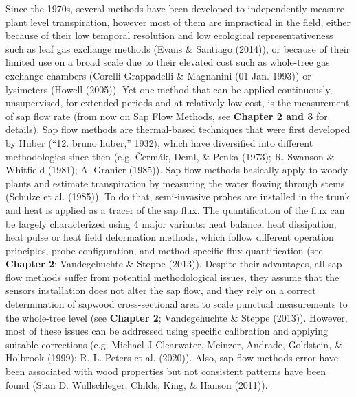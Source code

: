 \documentclass[11pt,twoside]{reedthesis}
\begin{document}
Since the 1970s, several methods have been developed to independently
measure plant level transpiration, however most of them are impractical
in the field, either because of their low temporal resolution and low
ecological representativeness such as leaf gas exchange methods (Evans
\& Santiago (2014)), or because of their limited use on a broad scale
due to their elevated cost such as whole-tree gas exchange chambers
(Corelli-Grappadelli \& Magnanini (01 Jan. 1993)) or lysimeters (Howell
(2005)). Yet one method that can be applied continuously, unsupervised,
for extended periods and at relatively low cost, is the measurement of
sap flow rate (from now on Sap Flow Methods, see \textbf{Chapter 2 and
3} for details). Sap flow methods are thermal-based techniques that were
first developed by Huber (``12. bruno huber,'' 1932), which have
diversified into different methodologies since then (e.g. Čermák, Deml,
\& Penka (1973); R. Swanson \& Whitfield (1981); A. Granier (1985)). Sap
flow methods basically apply to woody plants and estimate transpiration
by measuring the water flowing through stems (Schulze et al. (1985)). To
do that, semi-invasive probes are installed in the trunk and heat is
applied as a tracer of the sap flux. The quantification of the flux can
be largely characterized using 4 major variants: heat balance, heat
dissipation, heat pulse or heat field deformation methods, which follow
different operation principles, probe configuration, and method specific
flux quantification (see \textbf{Chapter 2}; Vandegehuchte \& Steppe
(2013)). Despite their advantages, all sap flow methods suffer from
potential methodological issues, they assume that the sensors
installation does not alter the sap flow, and they rely on a correct
determination of sapwood cross-sectional area to scale punctual
measurements to the whole-tree level (see \textbf{Chapter 2};
Vandegehuchte \& Steppe (2013)). However, most of these issues can be
addressed using specific calibration and applying suitable corrections
(e.g. Michael J Clearwater, Meinzer, Andrade, Goldstein, \& Holbrook
(1999); R. L. Peters et al. (2020)). Also, sap flow methods error have
been associated with wood properties but not consistent patterns have
been found (Stan D. Wullschleger, Childs, King, \& Hanson (2011)).\par
\end{document}
